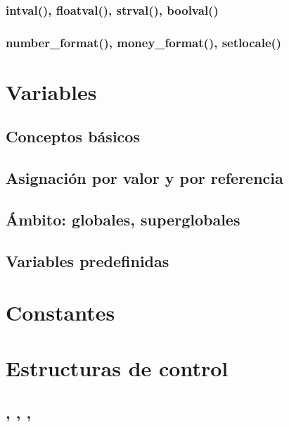 \documentclass[a4paper,11pt,spanish]{sphinxmanual}
\begin{document}
\subsubsection{intval(), floatval(), strval(), boolval()}
\label{\detokenize{contenidos:id91}}

\subsubsection{number\_format(), money\_format(), setlocale()}
\label{\detokenize{contenidos:id92}}

\section{Variables}
\label{\detokenize{contenidos:id93}}

\subsection{Conceptos básicos}
\label{\detokenize{contenidos:id94}}

\subsection{Asignación por valor y por referencia}
\label{\detokenize{contenidos:id95}}

\subsection{Ámbito: globales, superglobales}
\label{\detokenize{contenidos:id96}}

\subsection{Variables predefinidas}
\label{\detokenize{contenidos:id97}}

\section{Constantes}
\label{\detokenize{contenidos:id98}}

\section{Estructuras de control}
\label{\detokenize{contenidos:id99}}

\subsection{, , , }
\label{\detokenize{contenidos:id100}}
\end{document}
